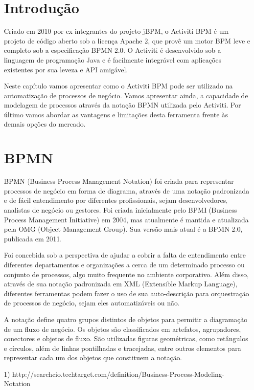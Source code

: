 \section{Introdução}\label{sec:LABEL_CHP_4_SEC_A}
Criado em 2010 por ex-integrantes do projeto jBPM, o Activiti BPM é um projeto de código aberto sob a licença Apache 2, que provê um motor BPM leve e completo sob a especificação BPMN 2.0. O Activiti é desenvolvido sob a linguagem de programação Java e é facilmente integrável com aplicações existentes por sua leveza e API amigável.

Neste capítulo vamos apresentar como o Activiti BPM pode ser utilizado na automatização de processos de negócio. Vamos apresentar ainda, a capacidade de modelagem de processos através da notação BPMN utilizada pelo Activiti. Por último vamos abordar as vantagens e limitações desta ferramenta frente às demais opções do mercado.

\section{BPMN}\label{sec:LABEL_CHP_4_SEC_B}
BPMN (Business Process Management Notation) foi criada para representar processos de negócio em forma de diagrama, através de uma notação padronizada e de fácil entendimento por diferentes profissionais, sejam desenvolvedores, analistas de negócio ou gestores. Foi criada inicialmente pelo BPMI (Business Process Management Initiative) em 2004, mas atualmente é mantida e atualizada pela OMG (Object Management Group). Sua versão mais atual é a BPMN 2.0, publicada em 2011.

Foi concebida sob a perspectiva de ajudar a cobrir a falta de entendimento entre diferentes departamentos e organizações a cerca de um determinado processo ou conjunto de processos, algo muito frequente no ambiente corporativo. Além disso, através de sua notação padronizada em XML (Extensible Markup Language), diferentes ferramentas podem fazer o uso de sua auto-descrição para orquestração de processos de negócio, sejam eles automatizáveis ou não.

A notação define quatro grupos distintos de objetos para permitir a diagramação de um fluxo de negócio. Os objetos são classificados em artefatos, agrupadores, conectores e objetos de fluxo. São utilizadas figuras geométricas, como retângulos e círculos, além de linhas pontilhadas e tracejadas, entre outros elementos para representar cada um dos objetos que constituem a notação.

1) http://searchcio.techtarget.com/definition/Business-Process-Modeling-Notation

